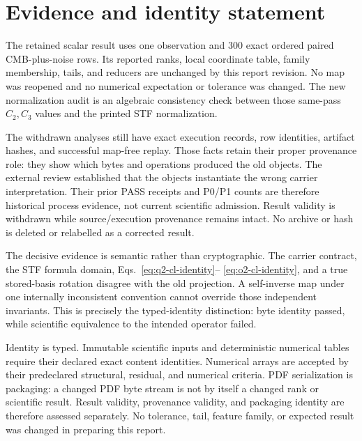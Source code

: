 \documentclass[11pt,a4paper]{article}
\begin{document}
\section{Evidence and identity statement}

The retained scalar result uses one observation and 300 exact ordered paired
CMB-plus-noise rows.  Its reported ranks, local coordinate table, family
membership, tails, and reducers are unchanged by this report revision.  No map
was reopened and no numerical expectation or tolerance was changed.  The new
normalization audit is an algebraic consistency check between those same-pass
$C_2,C_3$ values and the printed STF normalization.

The withdrawn analyses still have exact execution records, row identities,
artifact hashes, and successful map-free replay.  Those facts retain their
proper provenance role: they show which bytes and operations produced the old
objects.  The external review established that the objects instantiate the
wrong carrier interpretation.  Their prior PASS receipts and P0/P1 counts are
therefore historical process evidence, not current scientific admission.
Result validity is withdrawn while source/execution provenance remains intact.
No archive or hash is deleted or relabelled as a corrected result.

The decisive evidence is semantic rather than cryptographic.  The carrier
contract, the STF formula domain, Eqs.~\eqref{eq:q2-cl-identity}--
\eqref{eq:o2-cl-identity}, and a true stored-basis rotation disagree with the
old projection.  A self-inverse map under one internally inconsistent
convention cannot override those independent invariants.  This is precisely
the typed-identity distinction: byte identity passed, while scientific
equivalence to the intended operator failed.

Identity is typed.  Immutable scientific inputs and deterministic numerical
tables require their declared exact content identities.  Numerical arrays are
accepted by their predeclared structural, residual, and numerical criteria.
PDF serialization is packaging: a changed PDF byte stream is not by itself a
changed rank or scientific result.  Result validity, provenance validity, and
packaging identity are therefore assessed separately.  No tolerance, tail,
feature family, or expected result was changed in preparing this report.
\end{document}

